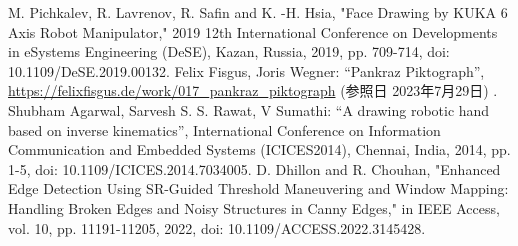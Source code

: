 \documentclass[10pt]{jarticle}
\begin{document}
    \vspace{5truemm}
    {\footnotesize
        \begin{thebibliography}{99}
            M. Pichkalev, R. Lavrenov, R. Safin and K. -H. Hsia, "Face Drawing by KUKA 6 Axis Robot Manipulator," 2019 12th International Conference on Developments in eSystems Engineering (DeSE), Kazan, Russia, 2019, pp. 709-714, doi: 10.1109/DeSE.2019.00132.
            Felix Fisgus, Joris Wegner: ``Pankraz Piktograph'', 
            \url{https://felixfisgus.de/work/017\_pankraz\_piktograph}
            (参照日 2023年7月29日) .
            Shubham Agarwal, Sarvesh S. S. Rawat, V Sumathi: ``A drawing robotic hand based on inverse kinematics'', 
            International Conference on Information Communication and Embedded Systems (ICICES2014), Chennai, India, 2014, pp. 1-5, doi: 10.1109/ICICES.2014.7034005.
		   D. Dhillon and R. Chouhan, "Enhanced Edge Detection Using SR-Guided Threshold Maneuvering and Window Mapping: Handling Broken Edges and Noisy Structures in Canny Edges," in IEEE Access, vol. 10, pp. 11191-11205, 2022, doi: 10.1109/ACCESS.2022.3145428.
            
        \end{thebibliography}
    }
    \normalsize
    
\end{document}
